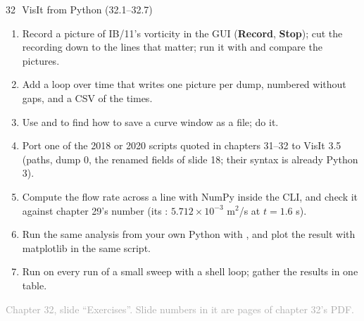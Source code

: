 \documentclass[aspectratio=169,11pt]{beamer}
\newcommand{\sourcecredit}[1]{\vfill\begin{flushright}\tiny\textcolor{DarkGray}{#1}\end{flushright}}
\providecommand{\gui}[1]{\textsf{\textbf{#1}}}
\begin{document}
\begin{frame}{32\,\textbullet\ VisIt from Python (32.1--32.7)}
\label{fr:c32x1}
\footnotesize
\begin{enumerate}\setlength{\itemsep}{1pt}
  \item[32.1] Record a picture of IB/11's vorticity in the GUI (\gui{Record}, \gui{Stop}); cut the recording down to the lines that matter; run it with  and compare the pictures.
  \item[32.2] Add a loop over time that writes one picture per dump, numbered without gaps, and a CSV of the times.
  \item[32.3] Use  and  to find how to save a curve window as a  file; do it.
  \item[32.4] Port one of the 2018 or 2020 scripts quoted in chapters 31--32 to VisIt 3.5 (paths, dump 0, the renamed fields of slide 18; their syntax is already Python 3).
  \item[32.5] Compute the flow rate across a line with NumPy inside the CLI, and check it against chapter 29's number (its : $5.712\times10^{-3}$ m$^2$/s at $t = 1.6$ s).
  \item[32.6] Run the same analysis from your own Python with , and plot the result with matplotlib in the same script.
  \item[32.7] Run  on every run of a small sweep with a shell loop; gather the results in one table.
\end{enumerate}
\sourcecredit{Chapter 32, slide ``Exercises''. Slide numbers in it are pages of chapter 32's PDF.}
\end{frame}
\end{document}
